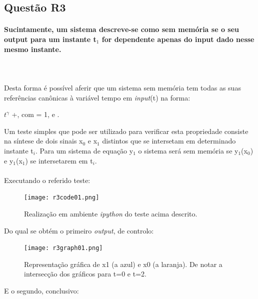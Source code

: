 \documentclass[a4paper,12pt]{article}
\begin{document}
		\subsection{Questão R3}
			\paragraph{Sucintamente, um sistema descreve-se como sem memória se o seu output para um instante t$_1$ for dependente apenas do input dado nesse mesmo instante.}
			\mbox{}\\
			\mbox{}\\
			Desta forma é possível aferir que um sistema sem memória tem todas as suas referências canônicas à variável tempo em \textit{input}(t) na forma:
			\\ 
			\begin{center}
				\textalpha $t^{\gamma}$ +\textbeta , com \textalpha = 1,  e .
			\end{center}
			Um teste simples que pode ser utilizado para verificar esta propriedade consiste na síntese de dois sinais x$_0$ e x$_1$ distintos que se intersetam em determinado instante t$_i$. Para um sistema de equação y$_1$ o sistema será sem memória se y$_1$(x$_0$) e y$_1$(x$_1$) se intersetarem em t$_i$.
			\mbox{}\\
			\mbox{}\\
			Executando o referido teste:
			\begin{figure}[H]
      				\centering
      				\captionsetup{justification=centering}
      				\texttt{[image: r3code01.png]}
				\caption{Realização em ambiente \textit{ipython} do teste acima descrito.}
      			\end{figure}
			Do qual se obtém o primeiro \textit{output}, de controlo:
			\begin{figure}[H]
        			\centering
        			\captionsetup{justification=centering}
        			\texttt{[image: r3graph01.png]}
				\caption{Representação gráfica de x1 (a azul) e x0 (a laranja). De notar a intersecção dos gráficos para t=0 e t=2.}
        		\end{figure}
			E o segundo, conclusivo:
\end{document}

